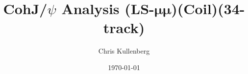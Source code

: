 \title{CohJ/$\psi$ Analysis (\textbf{LS}-$\boldsymbol{\mu\mu}$)(\textbf{Coil})(\textbf{34-track})}
\author{Chris Kullenberg}
\date{\today}
